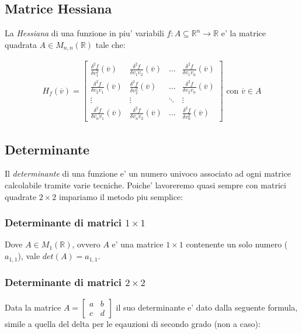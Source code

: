 \documentclass{article}
\begin{document}
\subsection{Matrice Hessiana}

La \emph{Hessiana} di una funzione in piu' variabili $f: A \subseteq \mathbb{R}^n
\to \mathbb{R}$ e' la matrice quadrata $A \in M_{n, n} (\mathbb{R})$ tale che:

\begin{align*}
  H_f(\overline{v}) =
  \begin{bmatrix}
    \frac{\delta^2 f}{\delta v_1^2}(\overline{v}) &
    \frac{\delta^2 f}{\delta v_1 v_2}(\overline{v}) & \ldots &
    \frac{\delta^2 f}{\delta v_1 v_n}(\overline{v}) \\
    \frac{\delta^2 f}{\delta v_2 v_1}(\overline{v}) &
    \frac{\delta^2 f}{\delta v_2^2}(\overline{v}) & \ldots &
    \frac{\delta^2 f}{\delta v_2 v_n}(\overline{v}) \\
    \vdots & \vdots & \ddots & \vdots \\
    \frac{\delta^2 f}{\delta v_n v_1}(\overline{v}) &
    \frac{\delta^2 f}{\delta v_n v_2}(\overline{v}) & \ldots &
    \frac{\delta^2 f}{\delta v_n^2}(\overline{v})
  \end{bmatrix} \text{ con } \overline{v} \in A
\end{align*}

\subsection{Determinante}

Il \emph{determinante} di una funzione e' un numero univoco associato ad ogni matrice
calcolabile tramite varie tecniche. Poiche' lavoreremo quasi sempre con matrici quadrate
$2 \times 2$ impariamo il metodo piu semplice:

\subsubsection{Determinante di matrici $1 \times 1$}
Dove $A \in M_{1} (\mathbb{R})$, ovvero $A$ e' una matrice $1 \times 1$
contenente un solo numero ($a_{1,1}$), vale $det(A) = a_{1,1}$.

\subsubsection{Determinante di matrici $2 \times 2$}

Data la matrice $A = \begin{bmatrix} a & b \\ c & d \end{bmatrix}$ il suo
determinante e' dato dalla seguente formula, simile a quella del delta per le
eqauzioni di secondo grado (non a caso):
\end{document}
